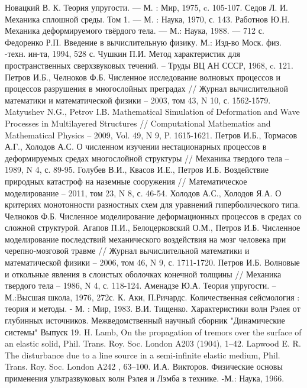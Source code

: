 \begin{thebibliography}{99}
Новацкий В. К. Теория упругости. — М. : Мир, 1975, c. 105-107.
Седов Л. И. Механика сплошной среды. Том 1. — М. : Наука, 1970, с. 143.
Работнов Ю.Н. Механика деформируемого твёрдого тела. — М.: Наука, 1988. — 712 с.
Федоренко Р.П. Введение в вычислительную физику. М.:
Изд-во Моск. физ. -техн. ин-та, 1994, 528 с.
Чушкин П.И. Метод характеристик для пространственных сверхзвуковых течений. –  Труды ВЦ АН СССР, 1968, c. 121.
Петров И.Б., Челноков Ф.Б. Численное исследование волновых процессов и процессов разрушения в многослойных преградах // Журнал вычислительной математики и математической физики – 2003, том 43, N 10, с. 1562-1579.
Matyushev N.G., Petrov I.B. Mathematical Simulation of Deformation and Wave Processes in Multilayered Structures // Computational Mathematics and Mathematical Physics – 2009, Vol. 49, N 9, P. 1615-1621.
Петров  И.Б., Тормасов А.Г., Холодов А.С. О численном изучении нестационарных процессов в деформируемых средах многослойной структуры // Механика твердого тела – 1989, N 4, с. 89-95.
Голубев В.И., Квасов И.Е., Петров И.Б. Воздействие природных катастроф на наземные сооружения // Математическое моделирование – 2011, том 23, N 8, с. 46-54.
Холодов А.С., Холодов Я.А. О критериях монотонности разностных
схем для уравнений гиперболического типа. 
Челноков Ф.Б. Численное моделирование деформационных
процессов в средах со сложной структурой.
Агапов П.И., Белоцерковский О.М., Петров И.Б. Численное моделирование последствий механического воздействия на мозг человека при черепно-мозговой травме // Журнал вычислительной математики и математической физики – 2006, том 46, N 9, с. 1711-1720.
Петров И.Б. Волновые и откольные явления в слоистых оболочках конечной толщины // Механика твердого тела – 1986, N 4, с. 118-124.
Аменадзе Ю.А. Теория упругости. – М.:Высшая школа, 1976, 272с.
К. Аки, П.Ричардс. Количественная сейсмология : теория и методы. - М. : Мир, 1983.
В.И. Тищенко. Характеристики волн Рэлея от глубинных источников. Межведомственный научный сборник "Динамические системы" Выпуск 19.
H. Lamb, On the propagation of tremors over the surface of an elastic solid, Phil. Trans. Roy. Soc. London A203 (1904), 1–42.
Lapwood E. R. The disturbance due to a line source in a semi-infinite elastic medium, Phil. Trans. Roy. Soc. London A242 , 63–100.
И.А. Викторов. Физические основы применения ультразвуковых волн Рэлея и Лэмба в технике. -М.: Наука, 1966.
\end{thebibliography}

